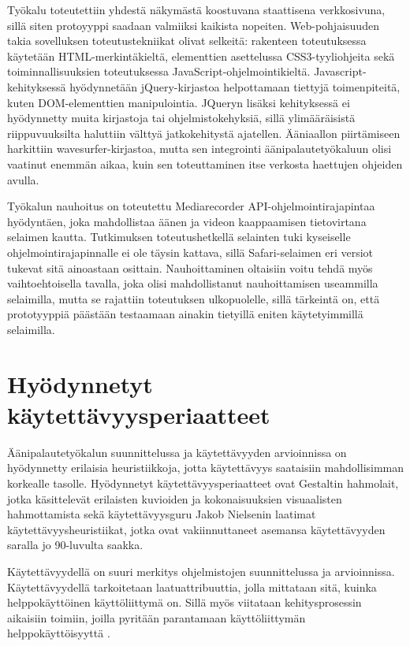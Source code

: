 \documentclass[utf8]{gradu3}
\begin{document}
Työkalu toteutettiin yhdestä näkymästä koostuvana staattisena verkkosivuna, sillä siten protoyyppi saadaan valmiiksi kaikista nopeiten. Web-pohjaisuuden takia sovelluksen toteutustekniikat olivat selkeitä: rakenteen toteutuksessa käytetään HTML-merkintäkieltä, elementtien asettelussa CSS3-tyyliohjeita sekä toiminnallisuuksien toteutuksessa JavaScript-ohjelmointikieltä. Javascript-kehityksessä hyödynnetään jQuery-kirjastoa helpottamaan tiettyjä toimenpiteitä, kuten DOM-elementtien manipulointia. JQueryn lisäksi kehityksessä ei hyödynnetty muita kirjastoja tai ohjelmistokehyksiä, sillä ylimääräisistä riippuvuuksilta haluttiin välttyä jatkokehitystä ajatellen. Ääniaallon piirtämiseen harkittiin wavesurfer-kirjastoa, mutta sen integrointi äänipalautetyökaluun olisi vaatinut enemmän aikaa, kuin sen toteuttaminen itse verkosta haettujen ohjeiden avulla.

Työkalun nauhoitus on toteutettu Mediarecorder API-ohjelmointirajapintaa hyödyntäen, joka mahdollistaa äänen ja videon kaappaamisen tietovirtana selaimen kautta. Tutkimuksen toteutushetkellä selainten tuki kyseiselle ohjelmointirajapinnalle ei ole täysin kattava, sillä Safari-selaimen eri versiot tukevat sitä ainoastaan osittain. Nauhoittaminen oltaisiin voitu tehdä myös vaihtoehtoisella tavalla, joka olisi mahdollistanut nauhoittamisen useammilla selaimilla, mutta se rajattiin toteutuksen ulkopuolelle, sillä tärkeintä on, että prototyyppiä päästään testaamaan ainakin tietyillä eniten käytetyimmillä selaimilla.

\section{Hyödynnetyt käytettävyysperiaatteet}

Äänipalautetyökalun suunnittelussa ja käytettävyyden arvioinnissa on hyödynnetty erilaisia heuristiikkoja, jotta käytettävyys saataisiin mahdollisimman korkealle tasolle. Hyödynnetyt käytettävyysperiaatteet ovat Gestaltin hahmolait, jotka käsittelevät erilaisten kuvioiden ja kokonaisuuksien visuaalisten hahmottamista sekä käytettävyysguru Jakob Nielsenin laatimat käytettävyysheuristiikat, jotka ovat vakiinnuttaneet asemansa käytettävyyden saralla jo 90-luvulta saakka.

Käytettävyydellä on suuri merkitys ohjelmistojen suunnittelussa ja arvioinnissa. Käytettävyydellä tarkoitetaan laatuattribuuttia, jolla mittataan sitä, kuinka helppokäyttöinen käyttöliittymä on. Sillä myös viitataan kehitysprosessin aikaisiin toimiin, joilla pyritään parantamaan käyttöliittymän helppokäyttöisyyttä \parencite[][]{intro-usability}.
\end{document}
